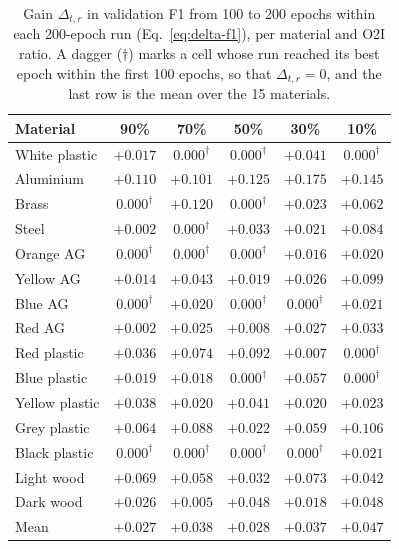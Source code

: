\begin{table}[htbp]
\centering
\caption[200-epoch gain for all 75 cells]{Gain $\Delta_{t,r}$ in validation F1 from 100
to 200 epochs within each 200-epoch run (Eq.~\eqref{eq:delta-f1}), per material and O2I
ratio. A dagger ($\dagger$) marks a cell whose run reached its best epoch within the
first 100 epochs, so that $\Delta_{t,r} = 0$, and the last row is the mean over the 15
materials.}
\label{tab:200epoch-full}
\small
\begin{tabular}{lccccc}
\toprule
Material & 90\% & 70\% & 50\% & 30\% &
10\% \\
\midrule
White plastic   & $+0.017$ & $0.000^{\dagger}$ & $0.000^{\dagger}$ & $+0.041$ & $0.000^{\dagger}$ \\
Aluminium       & $+0.110$ & $+0.101$ & $+0.125$ & $+0.175$ & $+0.145$ \\
Brass           & $0.000^{\dagger}$ & $+0.120$ & $0.000^{\dagger}$ & $+0.023$ & $+0.062$ \\
Steel           & $+0.002$ & $0.000^{\dagger}$ & $+0.033$ & $+0.021$ & $+0.084$ \\
Orange AG       & $0.000^{\dagger}$ & $0.000^{\dagger}$ & $0.000^{\dagger}$ & $+0.016$ & $+0.020$ \\
Yellow AG       & $+0.014$ & $+0.043$ & $+0.019$ & $+0.026$ & $+0.099$ \\
Blue AG         & $0.000^{\dagger}$ & $+0.020$ & $0.000^{\dagger}$ & $0.000^{\dagger}$ & $+0.021$ \\
Red AG          & $+0.002$ & $+0.025$ & $+0.008$ & $+0.027$ & $+0.033$ \\
Red plastic     & $+0.036$ & $+0.074$ & $+0.092$ & $+0.007$ & $0.000^{\dagger}$ \\
Blue plastic    & $+0.019$ & $+0.018$ & $0.000^{\dagger}$ & $+0.057$ & $0.000^{\dagger}$ \\
Yellow plastic  & $+0.038$ & $+0.020$ & $+0.041$ & $+0.020$ & $+0.023$ \\
Grey plastic    & $+0.064$ & $+0.088$ & $+0.022$ & $+0.059$ & $+0.106$ \\
Black plastic   & $0.000^{\dagger}$ & $0.000^{\dagger}$ & $0.000^{\dagger}$ & $0.000^{\dagger}$ & $+0.021$ \\
Light wood      & $+0.069$ & $+0.058$ & $+0.032$ & $+0.073$ & $+0.042$ \\
Dark wood       & $+0.026$ & $+0.005$ & $+0.048$ & $+0.018$ & $+0.048$ \\
\midrule
Mean           & $+0.027$ & $+0.038$ & $+0.028$ & $+0.037$ & $+0.047$ \\
\bottomrule
\end{tabular}
\end{table}

